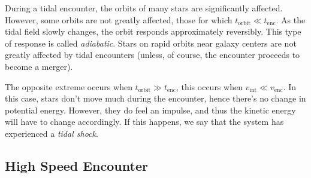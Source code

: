 During a tidal encounter, the orbits of many stars are significantly affected. However, some orbits are not greatly affected, those for which $t_{\text{orbit}}\ll t_\text{enc}$. As the tidal field slowly changes, the orbit responds approximately reversibly. This type of response is called \emph{adiabatic}. Stars on rapid orbits near galaxy centers are not greatly affected by tidal encounters (unless, of course, the encounter proceeds to become a merger).
\par The opposite extreme occurs when $t_{\text{orbit}}\gg t_\text{enc}$, this occurs when $v_{\text{int}}\ll v_{\text{enc}}$. In this case, stars don't move much during the encounter, hence there's no change in potential energy. However, they do feel an impulse, and thus the kinetic energy will have to change accordingly. If this happens, we say that the system has experienced a \emph{tidal shock}.

\subsection{High Speed Encounter}

